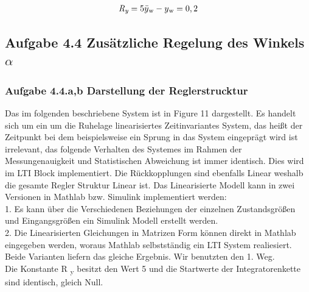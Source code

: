 \documentclass[10pt]{scrartcl}
\begin{document}
\begin{align}
\textit{R\textsubscript{y}} = 5 \bar{y}\textsubscript{w}-y\textsubscript{w} = 0,2 
\end{align}









\newpage
\subsection{Aufgabe 4.4 Zusätzliche Regelung des Winkels $\alpha$ }
\subsubsection{Aufgabe 4.4.a,b Darstellung der Reglerstrucktur}	
Das im folgenden beschriebene System ist in Figure 11 dargestellt. 
Es handelt sich um ein um die Ruhelage linearisiertes Zeitinvariantes System, das heißt der Zeitpunkt bei dem beispielsweise ein Sprung in das System eingeprägt wird ist irrelevant, das folgende Verhalten des Systemes im Rahmen der Messungenauigkeit und Statistischen Abweichung ist immer identisch. Dies wird im LTI Block implementiert. Die Rückkopplungen sind ebenfalls Linear weshalb die gesamte Regler Struktur Linear ist.
Das Linearisierte Modell kann in zwei Versionen in Mathlab bzw. Simulink implementiert werden:\\
1. Es kann über die Verschiedenen Beziehungen der einzelnen Zustandsgrößen und Eingangsgrößen ein Simulink Modell erstellt werden.\\
2. Die Linearisierten Gleichungen in Matrizen Form können direkt in Mathlab eingegeben werden, woraus Mathlab selbstständig ein LTI System realiesiert. \\
Beide Varianten liefern das gleiche Ergebnis.
Wir benutzten den 1. Weg. \\
Die Konstante R \textsubscript{y} besitzt den Wert 5 und die Startwerte der Integratorenkette sind identisch, gleich Null.\\
\end{document}
